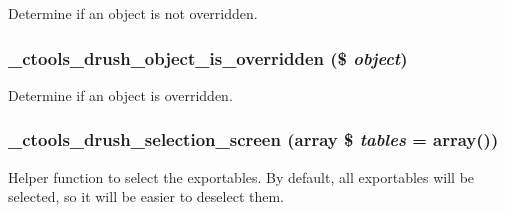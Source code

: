 \label{ctools_8drush_8inc_af2eb8efa4f7b5c4e54cde94156c41b0f}
Determine if an object is not overridden. \hypertarget{ctools_8drush_8inc_af6fec9d8bf469b68462241cdb045bc5f}{
\subsubsection[{\_\-ctools\_\-drush\_\-object\_\-is\_\-overridden}]{\setlength{\rightskip}{0pt plus 5cm}\_\-ctools\_\-drush\_\-object\_\-is\_\-overridden (\$ {\em object})}}
\label{ctools_8drush_8inc_af6fec9d8bf469b68462241cdb045bc5f}
Determine if an object is overridden. \hypertarget{ctools_8drush_8inc_a1ec2db7bb55a2ec3bc9cf43c744ac5e6}{
\subsubsection[{\_\-ctools\_\-drush\_\-selection\_\-screen}]{\setlength{\rightskip}{0pt plus 5cm}\_\-ctools\_\-drush\_\-selection\_\-screen (array \$ {\em tables} = {\ttfamily array()})}}
\label{ctools_8drush_8inc_a1ec2db7bb55a2ec3bc9cf43c744ac5e6}
Helper function to select the exportables. By default, all exportables will be selected, so it will be easier to deselect them.


